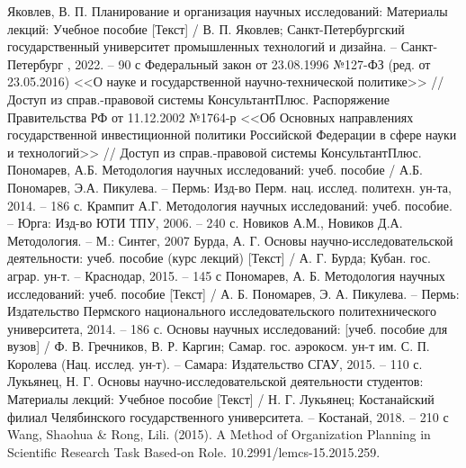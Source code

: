 \begin{thebibliography}{}
	 Яковлев, В. П. Планирование и организация научных исследований: Материалы лекций: Учебное пособие [Текст] / В. П. Яковлев;
	Санкт-Петербургский государственный университет
	промышленных технологий и дизайна. –
	Санкт-Петербург , 2022. – 90 с
	 Федеральный закон от 23.08.1996 №127-ФЗ
	(ред. от 23.05.2016)
	<<О науке и государственной
	научно-технической политике>> // Доступ из справ.-правовой системы КонсультантПлюс. 
	 Распоряжение Правительства РФ от
	11.12.2002 №1764-р
	<<Об Основных направлениях государственной
	инвестиционной политики Российской
	Федерации в сфере науки и технологий>> // Доступ из справ.-правовой системы КонсультантПлюс. 
	 Пономарев, А.Б.
	Методология научных исследований: учеб. пособие / А.Б. Пономарев, Э.А. Пикулева. – Пермь: Изд-во Перм. нац. исслед. политехн. ун-та, 2014. – 186 с. 
	 Крампит А.Г. Методология научных исследований: учеб. пособие. – Юрга: Изд-во ЮТИ ТПУ, 2006. – 240 с. 
	 Новиков А.М., Новиков Д.А. Методология. – М.: Синтег, 2007
	 Бурда, А. Г. Основы научно-исследовательской деятельности: учеб.
	пособие (курс лекций) [Текст] / А. Г. Бурда; Кубан. гос. аграр. ун-т. – Краснодар,
	2015. – 145 с
	 Пономарев, А. Б. Методология научных исследований: учеб. пособие
	[Текст] / А. Б. Пономарев, Э. А. Пикулева. – Пермь: Издательство Пермского
	национального исследовательского политехнического университета, 2014. –
	186 с.
	 Основы научных исследований: [учеб. пособие для вузов] /
	Ф. В. Гречников, В. Р. Каргин; Самар. гос. аэрокосм. ун-т им. С. П. Королева
	(Нац. исслед. ун-т). – Самара: Издательство СГАУ, 2015. – 110 с.
	 Лукьянец, Н. Г. Основы научно-исследовательской деятельности
	студентов: Материалы лекций: Учебное пособие [Текст] / Н. Г. Лукьянец;
	Костанайский филиал Челябинского государственного университета. –
	Костанай, 2018. – 210 с
	 Wang, Shaohua \& Rong, Lili. (2015). A Method of Organization Planning in Scientific Research Task Based-on Role. 10.2991/lemcs-15.2015.259.
\end{thebibliography}
